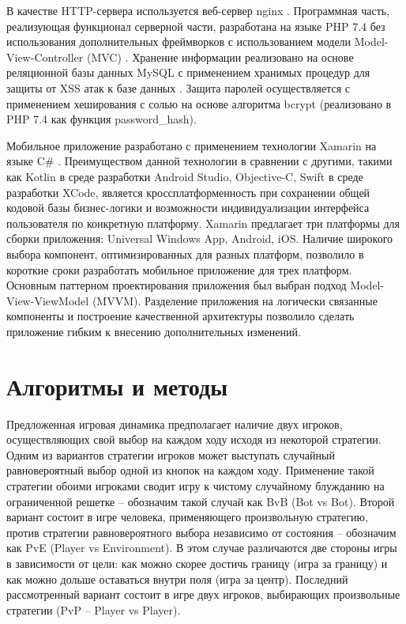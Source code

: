 В качестве HTTP-сервера используется веб-сервер nginx \cite{}. Программная часть, реализующая функционал серверной части, 
разработана на языке PHP 7.4 \cite{} без использования дополнительных фреймворков с использованием модели Model-View-Controller (MVC) \cite{}. 
Хранение информации реализовано на основе реляционной базы данных MySQL с применением хранимых процедур для защиты от XSS атак к базе данных \cite{}.
Защита паролей осуществляется с применением хеширования с солью на основе алгоритма bcrypt (реализовано в PHP 7.4 как функция password_hash).

Мобильное приложение разработано с применением технологии Xamarin на языке C# \cite{}. Преимуществом данной технологии в сравнении с 
другими, такими как Kotlin в среде разработки Android Studio, Objective-C, Swift в среде разработки XCode, является кроссплатформенность
при сохранении общей кодовой базы бизнес-логики и возможности индивидуализации интерфейса пользователя по конкретную платформу.
Xamarin предлагает три платформы для сборки приложения: Universal Windows App, Android, iOS. Наличие широкого выбора компонент,
оптимизированных для разных платформ, позволило в короткие сроки разработать мобильное приложение для трех платформ.
Основным паттерном проектирования приложения был выбран подход Model-View-ViewModel (MVVM). Разделение приложения на логически
связанные компоненты и построение качественной архитектуры позволило сделать приложение гибким к внесению дополнительных изменений.


\section{Алгоритмы и методы}\label{sec:ch1/sec3}

Предложенная игровая динамика предполагает наличие двух игроков, осуществляющих свой выбор на каждом ходу исходя из некоторой стратегии.
Одним из вариантов стратегии игроков может выступать случайный равновероятный выбор одной из кнопок на каждом ходу.
Применение такой стратегии обоими игроками сводит игру к чистому случайному блужданию на ограниченной решетке -- обозначим такой случай как BvB (Bot vs Bot).
Второй вариант состоит в игре человека, применяющего произвольную стратегию, против стратегии равновероятного выбора независимо от состояния -- обозначим как PvE (Player vs Environment).
В этом случае различаются две стороны игры в зависимости от цели: как можно скорее достичь границу (игра за границу) и
как можно дольше оставаться внутри поля (игра за центр). Последний рассмотренный вариант состоит в игре двух игроков, 
выбирающих произвольные стратегии (PvP -- Player vs Player).

